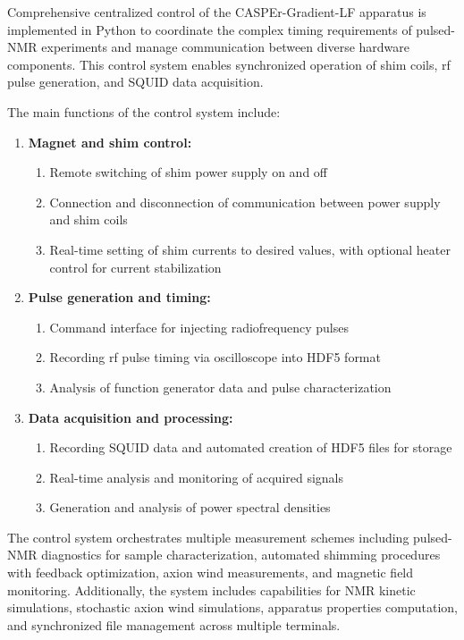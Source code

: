 Comprehensive centralized control of the CASPEr-Gradient-LF apparatus is implemented in Python to coordinate the complex timing requirements of pulsed-NMR experiments and manage communication between diverse hardware components. This control system enables synchronized operation of shim coils, rf pulse generation, and SQUID data acquisition. 

The main functions of the control system include:

\begin{enumerate}
    \item \textbf{Magnet and shim control:}
    \begin{enumerate}
        \item Remote switching of shim power supply on and off
        \item Connection and disconnection of communication between power supply and shim coils
        \item Real-time setting of shim currents to desired values, with optional heater control for current stabilization
    \end{enumerate}
    \item \textbf{Pulse generation and timing:}
    \begin{enumerate}
        \item Command interface for injecting radiofrequency pulses
        \item Recording rf pulse timing via oscilloscope into HDF5 format
        \item Analysis of function generator data and pulse characterization
    \end{enumerate}
    \item \textbf{Data acquisition and processing:}
    \begin{enumerate}
        \item Recording SQUID data and automated creation of HDF5 files for storage
        \item Real-time analysis and monitoring of acquired signals
        \item Generation and analysis of power spectral densities
    \end{enumerate}
\end{enumerate}

The control system orchestrates multiple measurement schemes including pulsed-NMR diagnostics for sample characterization, automated shimming procedures with feedback optimization, axion wind measurements, and magnetic field monitoring. Additionally, the system includes capabilities for NMR kinetic simulations, stochastic axion wind simulations, apparatus properties computation, and synchronized file management across multiple terminals.


